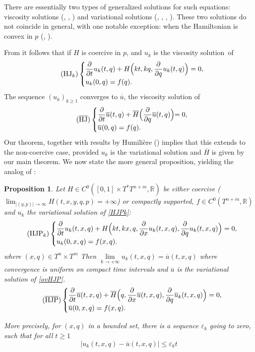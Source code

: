 \documentclass[JEP,XML,SOM,NoFloatCountersInSection,Unicode,published]{cedram}
\newcommand{\HJ}{\mathrm{HJ}}
\newcommand{\HJP}{\mathrm{HJP}}
\numberwithin{equation}{section}
\theoremstyle{plain}
\newtheorem{proposition}[theorem]{Proposition}
\theoremstyle{definition}
\theoremstyle{remark}
\begin{document}
There are essentially two types of generalized solutions for such
equations: viscosity solutions (\cf \cite{Crandall-Lions}, \cite{Barles}, \cite{Bardi-Capuzzo-Dolcetta}) and variational
solutions (\cf \cite{Sikorav-pc}, \cite{Chaperon1}, \cite{Viterbo-Ottolenghi}, \cite{Viterbo-HJ}). These two solutions do not coincide in
general, with one notable exception: when the Hamiltonian is
convex in $p$ (\cf \cite{Zhukovskaia-2}, \cite{Roos, WQ1}).

From \cite{L-P-V} it follows that if $H$ is coercive in $p$, and $u_{k}$ is
the viscosity solution~of
\[
\tag{$\HJ_{k}$}
\begin{cases}
\dfrac{\partial}{\partial t} u_{k} (t,q) + H \Bigl(kt, kq,
\dfrac{\partial}{\partial q} u_{k}(t,q)\Bigr) = 0,\\
u_{k} (0,q) = f(q).
\end{cases}
\]
The sequence $(u_{k})_{k\geq 1}$ converges to $\overline u$, the viscosity solution of
\[
\tag{$\overline{\HJ}$}
\begin{cases}
\dfrac{\partial}{\partial t} \overline{u} (t,q) + \overline{H}
\Bigl(\dfrac{\partial}{\partial q} \overline{u} (t,q)\Bigl) = 0,\\
\overline{u} (0,q) = f(q).
\end{cases}
\]
Our theorem, together with results by Humilière (\cf \cite[\S6, in particular Prop.\,6.1]{Humiliere}) implies that this extends to the non-coercive case, provided
$u_{k}$ is the variational solution and $\overline{H}$ is given by our
main theorem.
We now state the more general proposition, yielding the analog of \cite{L-P-V}:
\begin{proposition} \label{cor-3.5}
Let $H \in C^{0}([0,1]\times T^{*} T^{n+m}, {\mathbb R})$ be either coercive (\ie $\lim_{ \vert (y,p) \vert \to \infty} H(t,x,y,q,p) = +\infty$) or compactly supported, $f\in
C^{0}(T^{n+m}, {\mathbb R})$ and $u_{k}$ the variational solution of \eqref{HJPk}:
\[
\tag{$\HJP_{k}$}\label{HJPk}
\begin{cases}
\dfrac{\partial}{\partial t} u_{k} (t,x,q) + H \Bigl(kt,kx,q,
\dfrac{\partial}{\partial x} u_{k}(t,x,q), \dfrac{\partial}{\partial q} u_{k}(t,x,q)\Bigr) = 0,\\
u_{k} (0,x,q) = f(x,q).
\end{cases}
\]
where $(x,q)\in T^n \times T^m$
Then $\mathop{\lim}\limits_{k\to+\infty} u_{k}(t,x,q) = \overline{u} (t,x,q)$ where
convergence is uniform on compact time intervals and $\overline u$ is the variational
solution of \eqref{ovHJP}.
\[
\tag{$\overline{\HJP}$}\label{ovHJP}
\begin{cases}
\dfrac{\partial}{\partial t} \overline u (t,x,q) + \overline H \Bigl(q,
\dfrac{\partial}{\partial x} \overline u(t,x,q), \dfrac{\partial}{\partial q} \overline u_{k}(t,x,q)\Bigr) = 0,\\
\overline u (0,x,q) = f(x,q).
\end{cases}
\]

More precisely, for $(x,q)$ in a bounded set, there is a sequence $ \varepsilon _{k}$ going to zero, such that for all $t\geq 1$
\[
\vert u_{k}(t,x,q)- {\overline u}(t,x,q) \vert \leq \varepsilon_{k} t
\]
\end{proposition}
\end{document}
